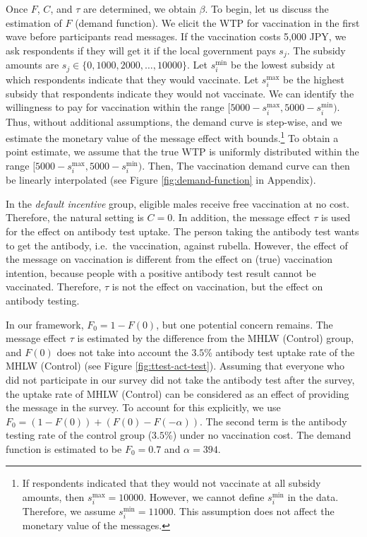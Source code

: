 \documentclass[
]{article}
\begin{document}
Once \(F\), \(C\), and \(\tau\) are determined, we obtain \(\beta\). To begin, let us discuss the estimation of \(F\) (demand function). We elicit the WTP for vaccination in the first wave before participants read messages. If the vaccination costs 5,000 JPY, we ask respondents if they will get it if the local government pays \(s_j\). The subsidy amounts are \(s_j \in \{0, 1000, 2000, \ldots , 10000\}\). Let \(s_i^{\text{min}}\) be the lowest subsidy at which respondents indicate that they would vaccinate. Let \(s_i^{\text{max}}\) be the highest subsidy that respondents indicate they would not vaccinate. We can identify the willingness to pay for vaccination within the range \([5000 - s_i^{\text{max}}, 5000 - s_i^{\text{min}})\). Thus, without additional assumptions, the demand curve is step-wise, and we estimate the monetary value of the message effect with bounds.\footnote{If respondents indicated that they would not vaccinate at all subsidy amounts, then \(s_i^{\text{max}} = 10000\). However, we cannot define \(s_i^{\text{min}}\) in the data. Therefore, we assume \(s_i^{\text{min}} = 11000\). This assumption does not affect the monetary value of the messages.} To obtain a point estimate, we assume that the true WTP is uniformly distributed within the range \([5000 - s_i^{\text{max}}, 5000 - s_i^{\text{min}})\). Then, The vaccination demand curve can then be linearly interpolated (see Figure \ref{fig:demand-function} in Appendix).

In the \emph{default incentive} group, eligible males receive free vaccination at no cost. Therefore, the natural setting is \(C=0\). In addition, the message effect \(\tau\) is used for the effect on antibody test uptake. The person taking the antibody test wants to get the antibody, i.e.~the vaccination, against rubella. However, the effect of the message on vaccination is different from the effect on (true) vaccination intention, because people with a positive antibody test result cannot be vaccinated. Therefore, \(\tau\) is not the effect on vaccination, but the effect on antibody testing.

In our framework, \(F_0=1-F(0)\), but one potential concern remains. The message effect \(\tau\) is estimated by the difference from the MHLW (Control) group, and \(F(0)\) does not take into account the \(3.5\)\% antibody test uptake rate of the MHLW (Control) (see Figure \ref{fig:ttest-act-test}). Assuming that everyone who did not participate in our survey did not take the antibody test after the survey, the uptake rate of MHLW (Control) can be considered as an effect of providing the message in the survey. To account for this explicitly, we use \(F_0=(1-F(0))+(F(0)-F(-\alpha))\). The second term is the antibody testing rate of the control group (\(3.5\)\%) under no vaccination cost. The demand function is estimated to be \(F_0=0.7\) and \(\alpha=394\).
\end{document}

